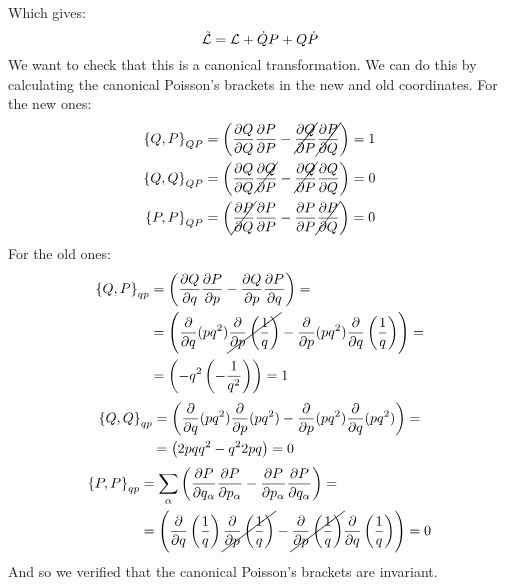 Which gives:
\begin{equation}
    \tilde{\mathcal{L}} = \mathcal{L} + \dot{Q}P + Q\dot{P}
\end{equation}
We want to check that this is a canonical transformation. We can do this by calculating the canonical Poisson's brackets in the new and old coordinates. For the new ones:
\begin{equation}
    \begin{split}
        \left\{Q,P\right\}_{QP} &= \left(\dfrac{\partial Q}{\partial Q} \dfrac{\partial P}{\partial P} - \cancel{\dfrac{\partial Q}{\partial P}} \cancel{\dfrac{\partial P}{\partial Q}} \right) = 1\\
        \left\{Q,Q\right\}_{QP} &= \left(\dfrac{\partial Q}{\partial Q} \cancel{\dfrac{\partial Q}{\partial P}} - \cancel{\dfrac{\partial Q}{\partial P}} \dfrac{\partial Q}{\partial Q} \right) = 0\\
        \left\{P,P\right\}_{QP} &= \left(\cancel{\dfrac{\partial P}{\partial Q}} \dfrac{\partial P}{\partial P}  -  \dfrac{\partial P}{\partial P} \cancel{\dfrac{\partial P}{\partial Q}}\right) = 0
    \end{split}
\end{equation}
For the old ones:
\begin{equation}
    \begin{split}
        \left\{Q,P\right\}_{qp} &= \left(\dfrac{\partial Q}{\partial q} \dfrac{\partial P}{\partial p} - \dfrac{\partial Q}{\partial p} \dfrac{\partial P}{\partial q} \right) = \\
        &= \left(\dfrac{\partial }{\partial q}(pq^2) \cancel{\dfrac{\partial }{\partial p}\left(\dfrac{1}{q}\right)} - \dfrac{\partial }{\partial p}(pq^2) \dfrac{\partial }{\partial q}\left(\dfrac{1}{q}\right) \right) = \\
        &= \left(- q^2  \left(-\dfrac{1}{q^2}\right) \right) = 1
    \end{split}
\end{equation}
\begin{equation}
    \begin{split}
        \left\{Q,Q\right\}_{qp} &= \left(\dfrac{\partial }{\partial q}(pq^2) \dfrac{\partial }{\partial p}(pq^2) - \dfrac{\partial }{\partial p}(pq^2) \dfrac{\partial }{\partial q}(pq^2) \right) = \\
        &= \left(2pq  q^2 - q^2  2pq \right) = 0
    \end{split}
\end{equation}
\begin{equation}
    \begin{split}
        \left\{P,P\right\}_{qp} &= \displaystyle\sum_{\alpha} \left(\dfrac{\partial P}{\partial q_{\alpha}} \dfrac{\partial P}{\partial p_{\alpha}} - \dfrac{\partial P}{\partial p_{\alpha}} \dfrac{\partial P}{\partial q_{\alpha}} \right) = \\
        &= \left(\dfrac{\partial }{\partial q}\left(\dfrac{1}{q}\right) \cancel{\dfrac{\partial }{\partial p}\left(\dfrac{1}{q}\right)} - \cancel{\dfrac{\partial }{\partial p}\left(\dfrac{1}{q}\right)} \dfrac{\partial }{\partial q}\left(\dfrac{1}{q}\right) \right) = 0
    \end{split}
\end{equation}
And so we verified that the canonical Poisson's brackets are invariant.
